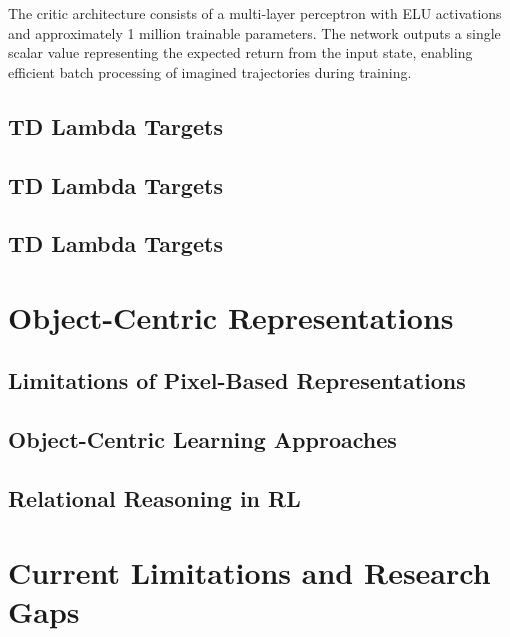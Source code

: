\documentclass[
	english,
	ruledheaders=section,
	class=report,
	thesis={type=master},
	accentcolor=9c,
	custommargins=true,
	marginpar=false,
	parskip=half-,
	fontsize=11pt,
]{tudapub}
\begin{document}
The critic architecture consists of a multi-layer perceptron with ELU activations and approximately 1 million trainable parameters. The network outputs a single scalar value representing the expected return from the input state, enabling efficient batch processing of imagined trajectories during training.



\subsection{TD Lambda Targets}
\label{subsec:tdlambdatargets}

\subsection{TD Lambda Targets}
\label{subsec:tdlambdatargets}

\subsection{TD Lambda Targets}
\label{subsec:tdlambdatargets}



\section{Object-Centric Representations}
\label{sec:object_centric}

\subsection{Limitations of Pixel-Based Representations}
\label{subsec:pixel_limitations}

\subsection{Object-Centric Learning Approaches}
\label{subsec:oc_approaches}

\subsection{Relational Reasoning in RL}
\label{subsec:relational_reasoning}

\section{Current Limitations and Research Gaps}
\label{sec:limitations}
\end{document}
